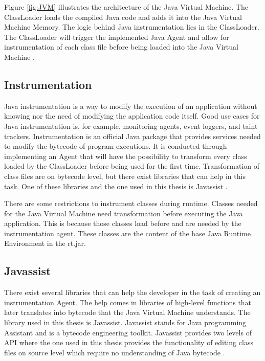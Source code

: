 Figure \ref{fig:JVM} illustrates the architecture of the Java Virtual Machine. The ClassLoader loads the compiled Java code and adds it into the Java Virtual Machine Memory. The logic behind Java instrumentation lies in the ClassLoader. The ClassLoader will trigger the implemented Java Agent and allow for instrumentation of each class file before being loaded into the Java Virtual Machine \parencite{venners_1999, instru}.



\subsection{Instrumentation}
Java instrumentation is a way to modify the execution of an application without knowing nor the need of modifying the application code itself. Good use cases for Java instrumentation is, for example, monitoring agents, event loggers, and taint trackers. Instrumentation is an official Java package that provides services needed to modify the bytecode of program executions. It is conducted through implementing an Agent that will have the possibility to transform every class loaded by the ClassLoader before being used for the first time. Transformation of class files are on bytecode level, but there exist libraries that can help in this task. One of these libraries and the one used in this thesis is Javassist \parencite{Java_Instrument, Javassist}.

There are some restrictions to instrument classes during runtime. Classes needed for the Java Virtual Machine need transformation before executing the Java application. This is because those classes load before and are needed by the instrumentation agent. These classes are the content of the base Java Runtime Environment in the rt.jar.



\subsection{Javassist}
There exist several libraries that can help the developer in the task of creating an instrumentation Agent. The help comes in libraries of high-level functions that later translates into bytecode that the Java Virtual Machine understands. The library used in this thesis is Javassist. Javassist stands for Java programming Assistant and is a bytecode engineering toolkit. Javassist provides two levels of API where the one used in this thesis provides the functionality of editing class files on source level which require no understanding of Java bytecode \parencite{Javassist}.